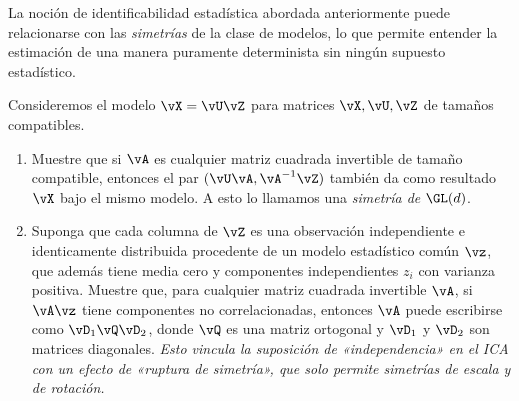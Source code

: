 \documentclass[../../book-main.tex]{subfiles}
\begin{document}
\begin{exercise}\label{exercise:symmetry-identifiability}
    La noción de identificabilidad estadística abordada anteriormente puede
    relacionarse con las \textit{simetrías} de la clase de modelos, lo que permite
    entender la estimación de una manera puramente determinista
    sin ningún supuesto estadístico.

    Consideremos el modelo $\vX = \vU \vZ$ para matrices $\vX, \vU, \vZ$
    de tamaños compatibles.
    \begin{enumerate}
        \item Muestre que si $\vA$ es cualquier matriz cuadrada invertible de
            tamaño compatible, entonces el par
            $(\vU \vA, \vA^{-1} \vZ)$ también da como resultado $\vX$ bajo el mismo
            modelo. A esto lo llamamos una \textit{simetría de $\GL(d)$}. 
        \item Suponga que cada columna de $\vZ$ es una observación independiente e
            identicamente distribuida procedente de un modelo estadístico común
            $\vz$, que además tiene media cero y
            componentes independientes $z_i$ con varianza positiva.
            Muestre que, para cualquier matriz cuadrada invertible $\vA$, si $\vA
            \vz$ tiene componentes no correlacionadas, entonces $\vA$ puede
            escribirse como $\vD_1 \vQ \vD_2$, donde $\vQ$ es una
            matriz ortogonal y $\vD_1$ y $\vD_2$ son matrices diagonales. 
            \textit{Esto vincula la suposición de «independencia» en el ICA
                con un efecto de «ruptura de simetría», que solo permite
            simetrías de escala y de rotación.}
    \end{enumerate}

\end{exercise}
\end{document}
